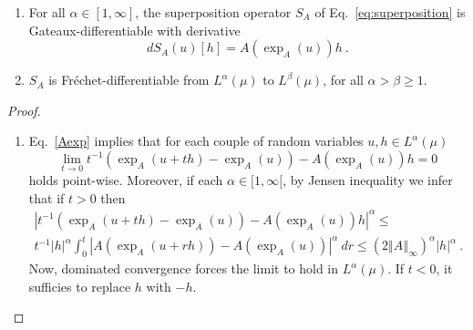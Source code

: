 \documentclass[graybox]{svmult}
\begin{document}
\begin{proposition}
\label{prop:BBA}
\begin{enumerate}
\item For all $\alpha \in [1,\infty]$, the superposition operator $S_A$ of
Eq.~\eqref{eq:superposition} is Gateaux-differentiable with derivative 
\begin{equation}  \label{eq:derivative-of-exp}
d S_A(u)[h] = A(\exp_A(u))h \ .
\end{equation}
\item $S_A$ is Fr\'echet-differentiable from $L^{\alpha}(\mu)$
to $L^{\beta}(\mu)$, for all $\alpha > \beta \ge 1$.
\end{enumerate}
\end{proposition}
%
\begin{proof}
\begin{enumerate}
\item Eq.~\eqref{Aexp} implies that for each couple of random variables 
$u,h\in L^{\alpha }(\mu )$ 
\begin{equation*}  
\lim_{t\rightarrow 0}t^{-1}\left( \exp _{A}(u+th)-\exp _{A}(u)\right)
-A(\exp _{A}(u))h=0
\end{equation*}
holds point-wise. Moreover, if each $\alpha \in \lbrack 1,\infty \lbrack $, by Jensen inequality we
infer that if $t > 0$ then 
\begin{multline*}
\left\vert t^{-1}\left( \exp _{A}(u+th)-\exp _{A}(u)\right) -A(\exp
_{A}(u))h\right\vert ^{\alpha }\leq \\
t^{-1}\left\vert h\right\vert ^{\alpha }\int_{0}^{t}\left\vert A(\exp
_{A}(u+rh))-A(\exp _{A}(u))\right\vert ^{\alpha }\ dr \leq \left( 2\left\Vert
A\right\Vert _{\infty }\right) ^{\alpha }\left\vert h\right\vert ^{\alpha }\
.
\end{multline*}
Now, dominated convergence forces the limit to hold in $L^{\alpha }(\mu )$. If $t < 0$, it sufficies to replace $h$ with $-h$.


\end{enumerate}
\end{proof}
\end{document}
